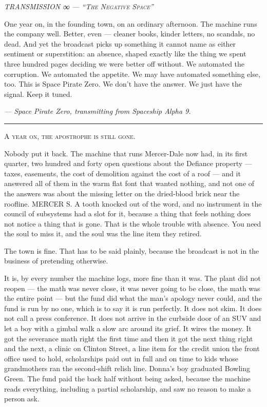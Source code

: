 \documentclass[11pt,openany]{book}
\newcommand{\transheader}{\normalfont\footnotesize\scshape\letterspace}
\newcommand{\letterspace}{}
\newenvironment{transmission}{%
  \par\vspace{0.3\baselineskip}\begin{center}\begin{minipage}{0.88\textwidth}%
  \itshape\small\setlength{\parindent}{0pt}\setstretch{1.06}}%
  {\end{minipage}\end{center}\vspace{0.4\baselineskip}%
  \noindent\hfil\rule{0.35\textwidth}{0.3pt}\hfil\par\vspace{1.0\baselineskip}}
\begin{document}
\begin{transmission}
{\transheader TRANSMISSION ∞ --- ``The Negative Space''}\par\vspace{0.5em}
One year on, in the founding town, on an ordinary afternoon. The machine runs the company well. Better, even --- cleaner books, kinder letters, no scandals, no dead. And yet the broadcast picks up something it cannot name as either sentiment or superstition: an absence, shaped exactly like the thing we spent three hundred pages deciding we were better off without. We automated the corruption. We automated the appetite. We may have automated something else, too. This is Space Pirate Zero. We don't have the answer. We just have the signal. Keep it tuned.\par
\vspace{0.5em}\hfill\textit{--- Space Pirate Zero, transmitting from Spaceship Alpha 9.}\par
\end{transmission}


\lettrine[lines=3, lhang=0.05, nindent=0.25em]{A}{ year on, the apostrophe is still gone.}

Nobody put it back. The machine that runs Mercer-Dale now had, in its first quarter, two hundred and forty open questions about the Defiance property --- taxes, easements, the cost of demolition against the cost of a roof --- and it answered all of them in the warm flat font that wanted nothing, and not one of the answers was about the missing letter on the dried-blood brick near the roofline. MERCER S. A tooth knocked out of the word, and no instrument in the council of subsystems had a slot for it, because a thing that feels nothing does not notice a thing that is gone. That is the whole trouble with absence. You need the soul to miss it, and the soul was the line item they retired.

The town is fine. That has to be said plainly, because the broadcast is not in the business of pretending otherwise.

It is, by every number the machine logs, more fine than it was. The plant did not reopen --- the math was never close, it was never going to be close, the math was the entire point --- but the fund did what the man's apology never could, and the fund is run by no one, which is to say it is run perfectly. It does not skim. It does not call a press conference. It does not arrive in the curbside door of an SUV and let a boy with a gimbal walk a slow arc around its grief. It wires the money. It got the severance math right the first time and then it got the next thing right and the next, a clinic on Clinton Street, a line item for the credit union the front office used to hold, scholarships paid out in full and on time to kids whose grandmothers ran the second-shift relish line. Donna's boy graduated Bowling Green. The fund paid the back half without being asked, because the machine reads everything, including a partial scholarship, and saw no reason to make a person ask.
\end{document}
